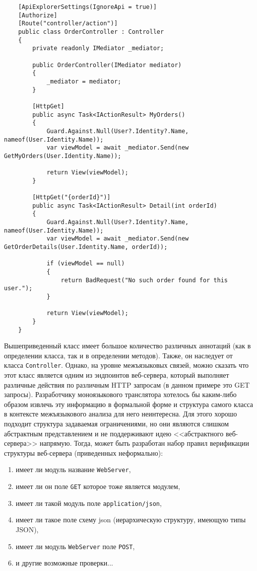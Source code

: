 \begin{verbatim}
    [ApiExplorerSettings(IgnoreApi = true)]
    [Authorize]
    [Route("controller/action")]
    public class OrderController : Controller
    {
        private readonly IMediator _mediator;
    
        public OrderController(IMediator mediator)
        {
            _mediator = mediator;
        }
    
        [HttpGet]
        public async Task<IActionResult> MyOrders()
        {   
            Guard.Against.Null(User?.Identity?.Name, nameof(User.Identity.Name));
            var viewModel = await _mediator.Send(new GetMyOrders(User.Identity.Name));
    
            return View(viewModel);
        }
    
        [HttpGet("{orderId}")]
        public async Task<IActionResult> Detail(int orderId)
        {
            Guard.Against.Null(User?.Identity?.Name, nameof(User.Identity.Name));
            var viewModel = await _mediator.Send(new GetOrderDetails(User.Identity.Name, orderId));
    
            if (viewModel == null)
            {
                return BadRequest("No such order found for this user.");
            }
    
            return View(viewModel);
        }
    }
\end{verbatim}

Вышеприведенный класс имеет большое количество различных аннотаций (как в определении класса, так и в определении
методов). Также, он наследует от класса \texttt{Controller}. Однако, на уровне межъязыковых связей, можно
сказать что этот класс является одним из эндпоинтов веб-сервера, который выполняет различные действия по различным
HTTP запросам (в данном примере это GET запросы). Разработчику моноязыкового транслятора хотелось бы каким-либо образом извлечь эту информацию
в формальной форме и структура самого класса в контексте межъязыкового анализа для него
неинтересна. Для этого хорошо подходит структура задаваемая ограничениями, но они являются слишком абстрактным представлением
и не поддерживают идею <<абстрактного веб-сервера>> напрямую. Тогда, может быть разработан набор правил верификации
структуры веб-сервера (приведенных неформально):
\begin{enumerate}[1)]
    \item имеет ли модуль название \texttt{WebServer},
    \item имеет ли он поле \texttt{GET} которое тоже является модулем,
    \item имеет ли такой модуль поле \texttt{application/json}, 
    \item имеет ли такое поле схему json (иерархическую структуру, имеющую типы JSON),
    \item имеет ли модуль \texttt{WebServer} поле \texttt{POST},
    \item и другие возможные проверки...
\end{enumerate}

